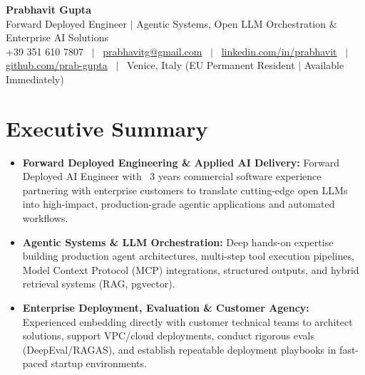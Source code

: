 \documentclass[a4paper,10pt]{article}
\begin{document}
\begin{minipage}[c]{0.80\textwidth}
  {\Huge\bfseries Prabhavit Gupta}\\[3pt]
  {\color{accent}\large Forward Deployed Engineer $\vert$ Agentic Systems, Open LLM Orchestration $\&$ Enterprise AI Solutions}\\[6pt]
  {\footnotesize +39 351 610 7807 ~$\vert$~
  \href{mailto:prabhavitg@gmail.com}{prabhavitg@gmail.com} ~$\vert$~
  \href{https://www.linkedin.com/in/prabhavit/}{linkedin.com/in/prabhavit} ~$\vert$~
  \href{https://github.com/prab-gupta}{github.com/prab-gupta} ~$\vert$~
  Venice, Italy (EU Permanent Resident $\vert$ Available Immediately)}
\end{minipage}\hfill

\vspace{6pt}

\section{Executive Summary}
\begin{itemize}
  \item \textbf{Forward Deployed Engineering \& Applied AI Delivery:} Forward Deployed AI Engineer with ~3 years commercial software experience partnering with enterprise customers to translate cutting-edge open LLMs into high-impact, production-grade agentic applications and automated workflows.
  \item \textbf{Agentic Systems \& LLM Orchestration:} Deep hands-on expertise building production agent architectures, multi-step tool execution pipelines, Model Context Protocol (MCP) integrations, structured outputs, and hybrid retrieval systems (RAG, pgvector).
  \item \textbf{Enterprise Deployment, Evaluation \& Customer Agency:} Experienced embedding directly with customer technical teams to architect solutions, support VPC/cloud deployments, conduct rigorous evals (DeepEval/RAGAS), and establish repeatable deployment playbooks in fast-paced startup environments.
\end{itemize}

\end{document}
